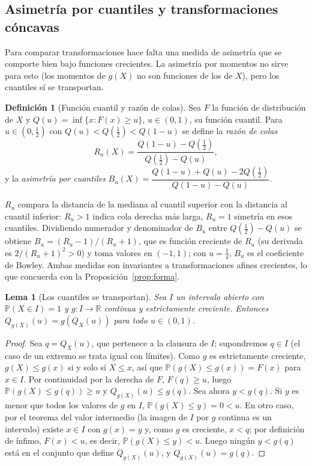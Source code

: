 \documentclass[11pt]{article}
\newtheorem{lema}[teorema]{Lema}
\theoremstyle{definition}
\newtheorem{definicion}[teorema]{Definición}
\theoremstyle{remark}
\newcommand{\R}{\mathbb{R}}
\newcommand{\Prob}{\mathbb{P}}
\begin{document}
\subsection{Asimetría por cuantiles y transformaciones cóncavas}\label{sec:asimetria-cuantiles}

\noindent Para comparar transformaciones hace falta una medida de asimetría que se comporte bien bajo funciones crecientes. La asimetría por momentos no sirve para esto (los momentos de $g(X)$ no son funciones de los de $X$), pero los cuantiles sí se transportan.

\begin{definicion}[Función cuantil y razón de colas]\label{def:razon-colas}
\noindent Sea $F$ la función de distribución de $X$ y $Q(u)=\inf\{x:F(x)\ge u\}$, $u\in(0,1)$, su función cuantil. Para $u\in(0,\frac12)$ con $Q(u)<Q(\frac12)<Q(1-u)$ se define la \emph{razón de colas}
\[
R_u(X)=\frac{Q(1-u)-Q(\tfrac12)}{Q(\tfrac12)-Q(u)},
\]
y la \emph{asimetría por cuantiles} $B_u(X)=\dfrac{Q(1-u)+Q(u)-2Q(\tfrac12)}{Q(1-u)-Q(u)}$.
\end{definicion}

\noindent $R_u$ compara la distancia de la mediana al cuantil superior con la distancia al cuantil inferior: $R_u>1$ indica cola derecha más larga, $R_u=1$ simetría en esos cuantiles. Dividiendo numerador y denominador de $B_u$ entre $Q(\frac12)-Q(u)$ se obtiene $B_u=(R_u-1)/(R_u+1)$, que es función creciente de $R_u$ (su derivada es $2/(R_u+1)^2>0$) y toma valores en $(-1,1)$; con $u=\frac14$, $B_u$ es el coeficiente de Bowley. Ambas medidas son invariantes a transformaciones afines crecientes, lo que concuerda con la Proposición~\ref{prop:forma}.

\begin{lema}[Los cuantiles se transportan]\label{lem:cuantiles}
\noindent Sea $I$ un intervalo abierto con $\Prob(X\in I)=1$ y $g:I\to\R$ continua y estrictamente creciente. Entonces $Q_{g(X)}(u)=g(Q_X(u))$ para todo $u\in(0,1)$.
\end{lema}
\begin{proof}
\noindent Sea $q=Q_X(u)$, que pertenece a la clausura de $I$; supondremos $q\in I$ (el caso de un extremo se trata igual con límites). Como $g$ es estrictamente creciente, $g(X)\le g(x)$ si y solo si $X\le x$, así que $\Prob(g(X)\le g(x))=F(x)$ para $x\in I$. Por continuidad por la derecha de $F$, $F(q)\ge u$, luego $\Prob(g(X)\le g(q))\ge u$ y $Q_{g(X)}(u)\le g(q)$. Sea ahora $y<g(q)$. Si $y$ es menor que todos los valores de $g$ en $I$, $\Prob(g(X)\le y)=0<u$. En otro caso, por el teorema del valor intermedio (la imagen de $I$ por $g$ continua es un intervalo) existe $x\in I$ con $g(x)=y$ y, como $g$ es creciente, $x<q$; por definición de ínfimo, $F(x)<u$, es decir, $\Prob(g(X)\le y)<u$. Luego ningún $y<g(q)$ está en el conjunto que define $Q_{g(X)}(u)$, y $Q_{g(X)}(u)=g(q)$.
\end{proof}
\end{document}
